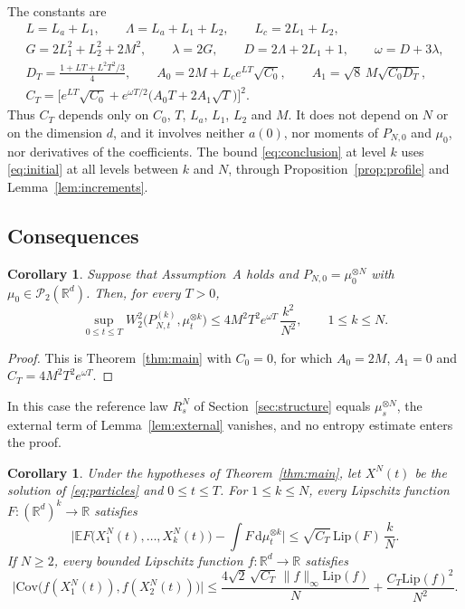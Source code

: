 \documentclass[11pt]{amsart}
\numberwithin{equation}{section}
\theoremstyle{plain}
\newtheorem{corollary}[theorem]{Corollary}
\theoremstyle{remark}
\newcommand{\R}{\mathbb{R}}
\newcommand{\E}{\mathbb{E}}
\newcommand{\cP}{\mathcal{P}}
\newcommand{\W}{W_2}
\newcommand{\Lip}{\mathrm{Lip}}
\newcommand{\dd}{\mathrm{d}}
\begin{document}
The constants are
\begin{gather}
L=L_a+L_1,\qquad \Lambda=L_a+L_1+L_2,\qquad L_c=2L_1+L_2,\label{eq:const1}\\
G=2L_1^2+L_2^2+2M^2,\qquad \lambda=2G,\qquad D=2\Lambda+2L_1+1,\qquad \omega=D+3\lambda,\label{eq:const2}\\
D_T=\frac{1+LT+L^2T^2/3}{4},\qquad A_0=2M+L_ce^{LT}\sqrt{C_0},\qquad A_1=\sqrt8\,M\sqrt{C_0D_T},\label{eq:const3}\\
C_T=\Big[e^{LT}\sqrt{C_0}+e^{\omega T/2}\big(A_0T+2A_1\sqrt T\big)\Big]^2.\label{eq:CT}
\end{gather}
Thus $C_T$ depends only on $C_0$, $T$, $L_a$, $L_1$, $L_2$ and $M$. It does not depend on $N$ or on the dimension $d$, and it involves neither $a(0)$, nor moments of $P_{N,0}$ and $\mu_0$, nor derivatives of the coefficients. The bound \eqref{eq:conclusion} at level $k$ uses \eqref{eq:initial} at all levels between $k$ and $N$, through Proposition~\ref{prop:profile} and Lemma~\ref{lem:increments}.

\subsection{Consequences}

\begin{corollary}\label{cor:iid}
Suppose that Assumption~A holds and $P_{N,0}=\mu_0^{\otimes N}$ with $\mu_0\in\cP_2(\R^d)$. Then, for every $T>0$,
\[
\sup_{0\le t\le T}\W^2\big(P^{(k)}_{N,t},\mu_t^{\otimes k}\big)\le4M^2T^2e^{\omega T}\,\frac{k^2}{N^2},\qquad 1\le k\le N.
\]
\end{corollary}

\begin{proof}
This is Theorem~\ref{thm:main} with $C_0=0$, for which $A_0=2M$, $A_1=0$ and $C_T=4M^2T^2e^{\omega T}$.
\end{proof}

In this case the reference law $R^N_s$ of Section~\ref{sec:structure} equals $\mu_s^{\otimes N}$, the external term of Lemma~\ref{lem:external} vanishes, and no entropy estimate enters the proof.

\begin{corollary}\label{cor:observables}
Under the hypotheses of Theorem~\ref{thm:main}, let $X^N(t)$ be the solution of \eqref{eq:particles} and $0\le t\le T$. For $1\le k\le N$, every Lipschitz function $F\colon(\R^d)^k\to\R$ satisfies
\begin{equation}\label{eq:obs1}
\Big|\E F\big(X^N_1(t),\dots,X^N_k(t)\big)-\int F\,\dd\mu_t^{\otimes k}\Big|\le\sqrt{C_T}\,\Lip(F)\,\frac kN.
\end{equation}
If $N\ge2$, every bounded Lipschitz function $f\colon\R^d\to\R$ satisfies
\begin{equation}\label{eq:obs2}
\Big|\mathrm{Cov}\big(f(X^N_1(t)),f(X^N_2(t))\big)\Big|\le\frac{4\sqrt2\,\sqrt{C_T}\,\|f\|_\infty\Lip(f)}{N}+\frac{C_T\Lip(f)^2}{N^2}.
\end{equation}
\end{corollary}
\end{document}
